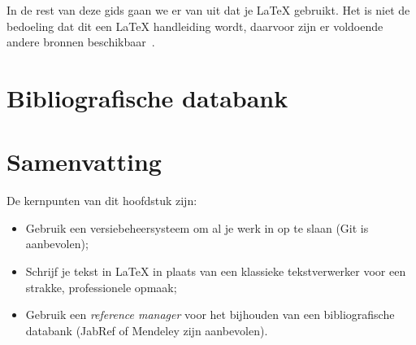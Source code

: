 

In de rest van deze gids gaan we er van uit dat je {\LaTeX} gebruikt. Het is niet de bedoeling dat dit een {\LaTeX} handleiding wordt, daarvoor zijn er voldoende andere bronnen beschikbaar~\citep{Oetiker2015}.

\section{Bibliografische databank}
\label{sec:bibliografische-databank}

\section{Samenvatting}
\label{sec:voorbereiding-samenvatting}

De kernpunten van dit hoofdstuk zijn:

\begin{itemize}
  \item Gebruik een versiebeheersysteem om al je werk in op te slaan (Git is aanbevolen);
  \item Schrijf je tekst in {\LaTeX} in plaats van een klassieke tekstverwerker voor een strakke, professionele opmaak;
  \item Gebruik een \emph{reference manager} voor het bijhouden van een bibliografische databank (JabRef of Mendeley zijn aanbevolen).
\end{itemize}
